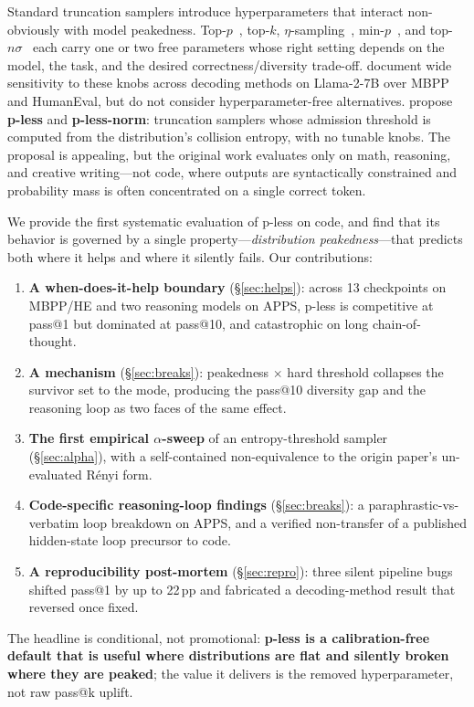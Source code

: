\documentclass[11pt]{article}                       %
\begin{document}
Standard truncation samplers introduce hyperparameters that interact non-obviously with model
peakedness. Top-$p$~\citep{holtzman2020curious}, top-$k$, $\eta$-sampling~\citep{hewitt2022truncation},
min-$p$~\citep{nguyen2024minp}, and top-$n\sigma$~\citep{tang2024topnsigma} each carry one or two free
parameters whose right setting depends on the model, the task, and the desired
correctness/diversity trade-off. \citet{shi2024decoding} document wide sensitivity to these knobs
across decoding methods on Llama-2-7B over MBPP and HumanEval, but do not consider
hyperparameter-free alternatives. \citet{tan2025pless} propose \textbf{p-less} and
\textbf{p-less-norm}: truncation samplers whose admission threshold is computed from the
distribution's collision entropy, with no tunable knobs. The proposal is appealing, but the original
work evaluates only on math, reasoning, and creative writing---not code, where outputs are
syntactically constrained and probability mass is often concentrated on a single correct token.

We provide the first systematic evaluation of p-less on code, and find that its behavior is governed
by a single property---\emph{distribution peakedness}---that predicts both where it helps and where
it silently fails. Our contributions:
\begin{enumerate}\itemsep2pt
  \item \textbf{A when-does-it-help boundary} (\S\ref{sec:helps}): across 13 checkpoints on MBPP/HE
    and two reasoning models on APPS, p-less is competitive at pass@1 but dominated at pass@10, and
    catastrophic on long chain-of-thought.
  \item \textbf{A mechanism} (\S\ref{sec:breaks}): peakedness $\times$ hard threshold collapses the
    survivor set to the mode, producing the pass@10 diversity gap and the reasoning loop as two faces
    of the same effect.
  \item \textbf{The first empirical $\alpha$-sweep} of an entropy-threshold sampler
    (\S\ref{sec:alpha}), with a self-contained non-equivalence to the origin paper's un-evaluated
    R\'enyi form.
  \item \textbf{Code-specific reasoning-loop findings} (\S\ref{sec:breaks}): a paraphrastic-vs-verbatim
    loop breakdown on APPS, and a verified non-transfer of a published hidden-state loop precursor to
    code.
  \item \textbf{A reproducibility post-mortem} (\S\ref{sec:repro}): three silent pipeline bugs shifted
    pass@1 by up to 22\,pp and fabricated a decoding-method result that reversed once fixed.
\end{enumerate}
The headline is conditional, not promotional: \textbf{p-less is a calibration-free default that is
useful where distributions are flat and silently broken where they are peaked}; the value it delivers
is the removed hyperparameter, not raw pass@k uplift.
\end{document}
